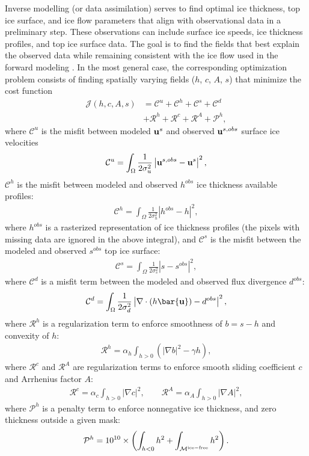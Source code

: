 \documentclass[gmd]{copernicus}
\begin{document}
Inverse modelling (or data assimilation) serves to find optimal ice thickness, top ice surface, and ice flow parameters that align with observational data in a preliminary step. These observations can include surface ice speeds, ice thickness profiles, and top ice surface data. The goal is to find the fields that best explain the observed data while remaining consistent with the ice flow used in the forward modeling \citep{jouvet2023inversion,jouvet2023ice}. In the most general case, the corresponding optimization problem consists of finding spatially varying fields ($h$, $c$, $A$, $s$) that minimize the cost function
\begin{align}
\mathcal{J}(h,c,A,s) & =\mathcal{C}^u+\mathcal{C}^h+\mathcal{C}^s +\mathcal{C}^{d} \label{misfit} \\
&+\mathcal{R}^h+\mathcal{R}^{c}+\mathcal{R}^{A}+\mathcal{P}^h,  \nonumber
\end{align}
where $\mathcal{C}^u$ is the misfit between modeled ${\bf u}^{s}$ and observed 
${\bf u}^{s,obs}$ surface ice velocities 
\begin{align}
\mathcal{C}^u=\int_{\Omega}\frac{1}{2\sigma_u^2}\left|{\bf u}^{s,obs}-{\bf u}^{s}\right|^2,
\end{align} 
$\mathcal{C}^h$ is the misfit between modeled and observed $h^{obs}$ ice thickness available profiles:
\begin{align}
\mathcal{C}^h= \int_{\Omega}\frac{1}{2 \sigma_h^2}|h^{obs} -h |^2,
\end{align}
where $h^{obs}$ is a rasterized representation of ice thickness profiles
(the pixels with missing data are ignored in the above integral), and
$\mathcal{C}^s$ is the misfit between the modeled and observed $s^{obs}$ top ice surface:
\begin{align}
\mathcal{C}^s=\int_{\Omega}\frac{1}{2 \sigma_s^2}\left|s-s^{obs}\right|^2,
\end{align}
where $\mathcal{C}^{d}$ is a misfit term between the modeled and observed flux divergence $d^{obs}$:
\begin{align}
\mathcal{C}^{d}=\int_{\Omega}\frac{1}{2 \sigma_d^2}\left|\nabla \cdot (h {\bar{\bf u}})-d^{obs} \right|^2,
\end{align}
where $\mathcal{R}^h$ is a regularization term to enforce smoothness of $b=s-h$
and convexity of $h$:
\begin{align}
\mathcal{R}^h=\alpha_h\int_{h>0}\left(|\nabla b |^2 -\gamma h\right),
\end{align}
where $\mathcal{R}^{c}$ and $\mathcal{R}^{A}$ are regularization terms to enforce smooth sliding coefficient $c$ and Arrhenius factor $A$:
\begin{align}
\mathcal{R}^c=\alpha_c \int_{h>0}|\nabla c |^2, \qquad
\mathcal{R}^A=\alpha_A \int_{h>0}|\nabla A |^2,
\end{align}
where $\mathcal{P}^h$ is a penalty term to enforce nonnegative ice thickness, 
and zero thickness outside a given mask:
\begin{align}
\mathcal{P}^h=10^{10} \times \left(\int_{h<0} h^2+\int_{\mathcal{M}^{\rm ice-free}} h^2 \right).
\end{align}
\end{document}

